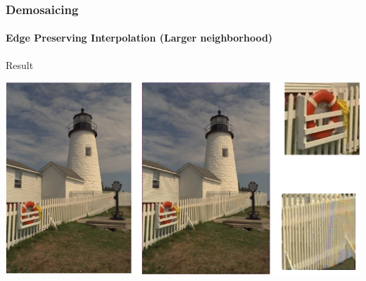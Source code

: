 \documentclass{beamer}
\begin{document}
\begin{frame}
\frametitle{Demosaicing}
\framesubtitle{Edge Preserving Interpolation \small{(Larger neighborhood)}}
\begin{block}{Result}
\begin{center}
\includegraphics[scale=0.33]{images/L7_res_PRI.png}
\end{center}

\end{block}
\end{frame}
%
%
%
\end{document}
